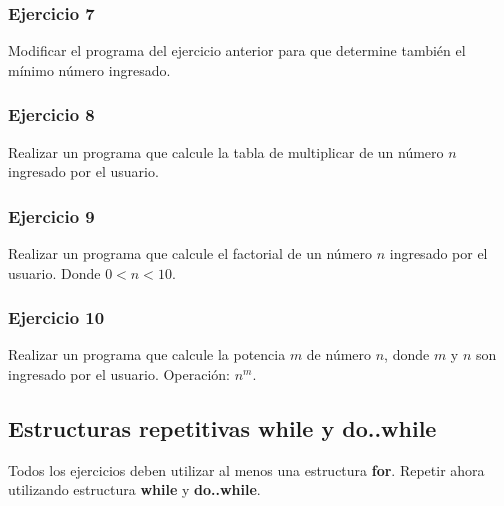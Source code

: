 \subsubsection{Ejercicio 7} 
Modificar el programa del ejercicio anterior para que determine también el mínimo número ingresado.
{\small
  \lstset{inputencoding=utf8/latin1}
  
}

\subsubsection{Ejercicio 8} 
Realizar un programa que calcule la tabla de multiplicar de un número $n$ ingresado por el usuario.
{\small
  \lstset{inputencoding=utf8/latin1}
  
}

\subsubsection{Ejercicio 9} 
Realizar un programa que calcule el factorial de un número $n$ ingresado por el usuario. Donde $0<n<10$.
{\small
  \lstset{inputencoding=utf8/latin1}
  
}

\subsubsection{Ejercicio 10} 
Realizar un programa que calcule la potencia $m$ de número $n$, donde $m$ y $n$ son ingresado por el usuario. Operación: $n^m$.
{\small
  \lstset{inputencoding=utf8/latin1}
  
}

\subsection*{Estructuras repetitivas while y do..while}
Todos los ejercicios deben utilizar al menos una estructura \textbf{for}.
Repetir ahora utilizando estructura \textbf{while} y \textbf{do..while}.

